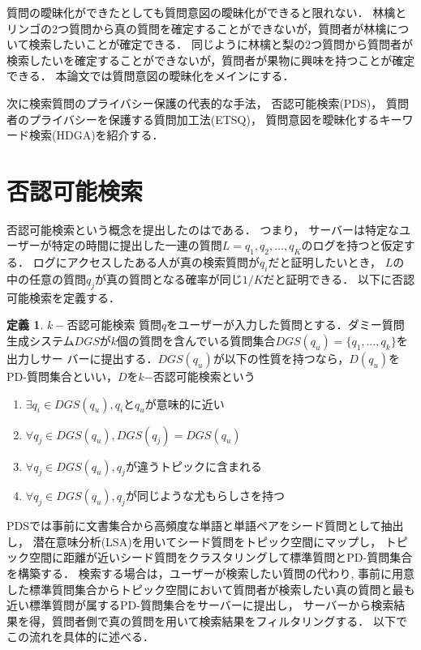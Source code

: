 \documentclass[master]{suribt}
\theoremstyle{definition}
\newtheorem{defi}[thm]{定義}
\begin{document}
 質問の曖昧化ができたとしても質問意図の曖昧化ができると限れない．
 {林檎}と{リンゴ}の2つ質問から真の質問を確定することができないが，質問者が林檎について検索したいことが確定できる．
 同じように{林檎}と{梨}の2つ質問から質問者が検索したいを確定することができないが，質問者が果物に興味を持つことが確定できる．
 本論文では質問意図の曖昧化をメインにする．

 次に検索質問のプライバシー保護の代表的な手法，
 否認可能検索(PDS)\cite{providing2009}，
 質問者のプライバシーを保護する質問加工法(ETSQ)\cite{embellishing2010}，
 質問意図を曖昧化するキーワード検索(HDGA)\cite{masking2014}を紹介する．
 
 \section{否認可能検索}\label{s:PDS}
 否認可能検索という概念を提出したのは\cite{PDS2008}である．
 つまり， サーバーは特定なユーザーが特定の時間に提出した一連の質問$L = {q_1, q_2, \dots , q_K}$のログを持つと仮定する． 
 ログにアクセスしたある人が真の検索質問が$q_i$だと証明したいとき， $L$の中の任意の質問$q_j$が真の質問となる確率が同じ$1/K$だと証明できる．
 以下に否認可能検索を定義する．
 \begin{defi}{$k−$否認可能検索}
 	質問$q$をユーザーが入力した質問とする．ダミー質問生成システム$DGS$が$k$個の質問を含んでいる質問集合$DGS(q_u)=\{q_1, \dots , q_k\}$を出力しサー
	バーに提出する．$DGS(q_u)$が以下の性質を持つなら，$D(q_u)$をPD-質問集合といい，$D$を$k$−否認可能検索という
	\begin{enumerate}
	\item $\exists q_i \in DGS(q_u),q_i$と$q_u$が意味的に近い
	\item $\forall q_j \in DGS(q_u),DGS(q_j) = DGS(q_u)$
	\item $\forall q_j \in DGS(q_u),q_j$が違うトピックに含まれる
	\item $\forall q_j \in DGS(q_u),q_j$が同じような尤もらしさを持つ
	\end{enumerate}
  \end{defi}
 PDSでは事前に文書集合から高頻度な単語と単語ペアをシード質問として抽出し，
 潜在意味分析(LSA)\cite{LSA1990}を用いてシード質問をトピック空間にマップし，
 トピック空間に距離が近いシード質問をクラスタリングして標準質問とPD-質問集合を構築する．
 検索する場合は，ユーザーが検索したい質問の代わり,
 事前に用意した標準質問集合からトピック空間において質問者が検索したい真の質問と最も近い標準質問が属するPD-質問集合をサーバーに提出し，
 サーバーから検索結果を得，質問者側で真の質問を用いて検索結果をフィルタリングする．
 以下でこの流れを具体的に述べる．
\end{document}
